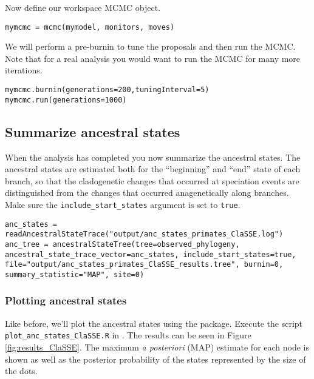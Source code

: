 Now define our workspace MCMC object.
{\tt \begin{snugshade*}
\begin{lstlisting}
mymcmc = mcmc(mymodel, monitors, moves)
\end{lstlisting}
\end{snugshade*}}

We will perform a pre-burnin to tune the proposals
and then run the MCMC. Note that for a real analysis you would
want to run the MCMC for many more iterations.
{\tt \begin{snugshade*}
\begin{lstlisting}
mymcmc.burnin(generations=200,tuningInterval=5)
mymcmc.run(generations=1000)
\end{lstlisting}
\end{snugshade*}}

\subsection{Summarize ancestral states}

When the analysis has completed you now summarize the ancestral states.
The ancestral states are estimated both for the ``beginning'' and ``end''
state of each branch, so that the cladogenetic changes that occurred at speciation events
are distinguished from the changes that occurred anagenetically along branches.
Make sure the \texttt{include\_start\_states} argument is set to \texttt{true}.
{\tt \begin{snugshade*}
\begin{lstlisting}
anc_states = readAncestralStateTrace("output/anc_states_primates_ClaSSE.log")
anc_tree = ancestralStateTree(tree=observed_phylogeny, ancestral_state_trace_vector=anc_states, include_start_states=true, file="output/anc_states_primates_ClaSSE_results.tree", burnin=0, summary_statistic="MAP", site=0)
\end{lstlisting}
\end{snugshade*}}

\subsubsection{Plotting ancestral states}

Like before, we'll plot the ancestral states 
using the \RevGadgets \R package.
Execute the script \\ \texttt{plot\_anc\_states\_ClaSSE.R} in \R.
The results can be seen in Figure \ref{fig:results_ClaSSE}.
The maximum \emph{a posteriori} (MAP) estimate for each node is shown as well as the posterior probability of the states represented by the size of the dots.

